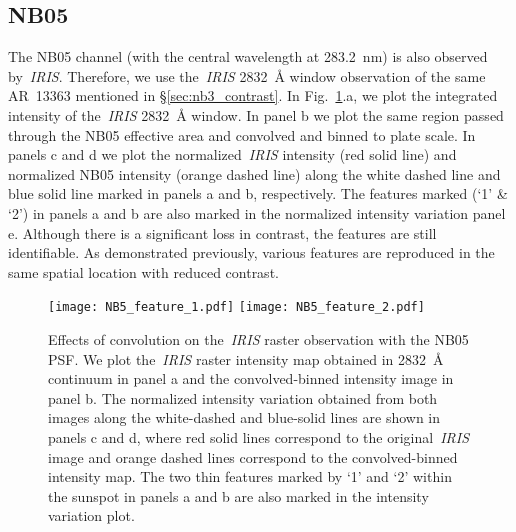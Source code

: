 \subsection{NB05}\label{sec:nb5_contrast}

The NB05 channel (with the central wavelength at 283.2~nm) is also observed by~{\it IRIS}. Therefore, we use the~{\it IRIS} 2832~{\AA} window observation of the same AR~13363 mentioned in \S\ref{sec:nb3_contrast}. %
In Fig.~\ref{fig:nb5_conv}.a, we plot the integrated intensity of the~{\it IRIS} 2832~{\AA} window. In panel b we plot the same region passed through the NB05 effective area and convolved and binned to {\suit} plate scale. In panels c and d we plot the normalized~{\it IRIS} intensity (red solid line) and normalized {\suit} NB05 intensity (orange dashed line) along the white dashed line and blue solid line marked in panels a and b, respectively. The features marked (`1' \& `2') in panels a and b are also marked in the normalized intensity variation panel e. Although there is a significant loss in contrast, the features are still identifiable. As demonstrated previously, various features are reproduced in the same spatial location with reduced contrast.

\begin{figure}
    \centering
    \texttt{[image: NB5\_feature\_1.pdf]}
    \texttt{[image: NB5\_feature\_2.pdf]}
    \caption[Effects of convolution on the~{\it IRIS} raster observation with the NB05 PSF]{Effects of convolution on the~{\it IRIS} raster observation with the NB05 PSF. We plot the~{\it IRIS} raster intensity map obtained in 2832~{\AA} continuum in panel a and the convolved-binned intensity image in panel b. 
    The normalized intensity variation obtained from both images along the white-dashed and blue-solid lines are shown in panels c and d, where red solid lines correspond to the original~{\it IRIS} image and orange dashed lines correspond to the convolved-binned intensity map. The two thin features marked by `1' and `2' within the sunspot in panels a and b are also marked in the intensity variation plot.}
\label{fig:nb5_conv}
\end{figure}


